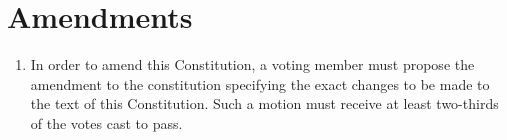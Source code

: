 \chapter{Amendments}

\begin{enumerate}[label=\Alph*.]
\item  In order to amend this Constitution, a voting member must propose the amendment to the constitution specifying the exact changes to be made to the text of this Constitution. Such a motion
must receive at least two-thirds of the votes cast to pass.
\end{enumerate}
